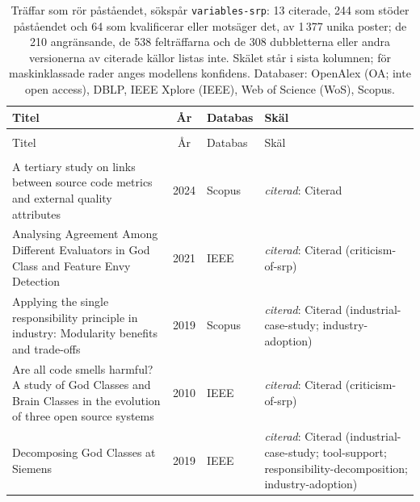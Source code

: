 
\begingroup\footnotesize
\begin{longtable}{@{}%
  >{\raggedright\arraybackslash}p{}c%
  >{\raggedright\arraybackslash}p{}%
  >{\raggedright\arraybackslash}p{}@{}}
\caption{Träffar som rör påståendet, sökspår \texttt{variables-srp}: 13 citerade, 244 som stöder påståendet och 64 som kvalificerar eller motsäger det, av 1\,377 unika poster; de 210 angränsande, de 538 felträffarna och de 308 dubbletterna eller andra versionerna av citerade källor listas inte.  Skälet står i sista kolumnen; för maskinklassade rader anges modellens konfidens.  Databaser: OpenAlex (OA; inte \foreignlanguage{english}{open access}), DBLP, IEEE Xplore (IEEE), Web of Science (WoS), Scopus.}\label{tab:srp}\\
\toprule
Titel & År & Databas & Skäl \\
\midrule
\endfirsthead
\multicolumn{4}{@{}l}{\emph{\tablename~\thetable{} (\GetTranslation{continued})}}\\
\toprule
Titel & År & Databas & Skäl \\
\midrule
\endhead
\midrule \multicolumn{4}{r@{}}{\emph{\GetTranslation{continued on the next page}}}\\
\endfoot
\bottomrule
\endlastfoot
A tertiary study on links between source code metrics and external quality attributes & 2024 & Scopus & \emph{citerad}: Citerad \\
Analysing Agreement Among Different Evaluators in God Class and Feature Envy Detection & 2021 & IEEE & \emph{citerad}: Citerad (criticism-of-srp) \\
Applying the single responsibility principle in industry: Modularity benefits and trade-offs & 2019 & Scopus & \emph{citerad}: Citerad (industrial-case-study; industry-adoption) \\
Are all code smells harmful? A study of God Classes and Brain Classes in the evolution of three open source systems & 2010 & IEEE & \emph{citerad}: Citerad (criticism-of-srp) \\
Decomposing God Classes at Siemens & 2019 & IEEE & \emph{citerad}: Citerad (industrial-case-study; tool-support; responsibility-decomposition; industry-adoption) \\

\end{longtable}
